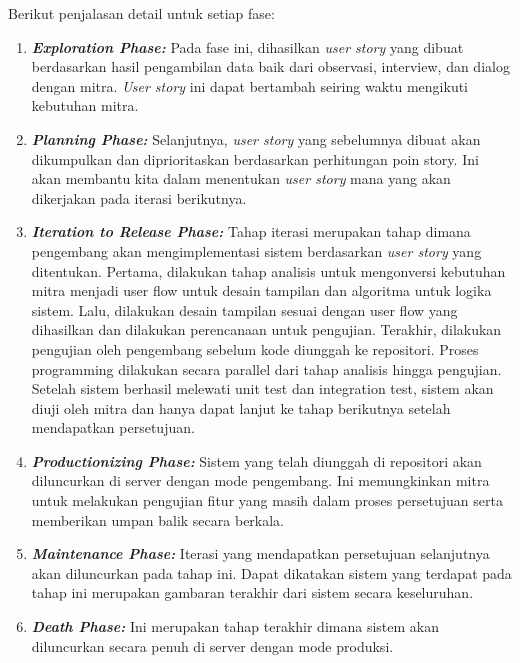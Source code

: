 Berikut penjalasan detail untuk setiap fase:
\begin{enumerate}
    \item \textbf{\textit{Exploration Phase:}}
    Pada fase ini, dihasilkan \textit{user story} yang dibuat berdasarkan hasil pengambilan data baik dari observasi, interview, dan dialog dengan mitra. \textit{User story} ini dapat bertambah seiring waktu mengikuti kebutuhan mitra.

    \item \textbf{\textit{Planning Phase:}}
    Selanjutnya, \textit{user story} yang sebelumnya dibuat akan dikumpulkan dan diprioritaskan berdasarkan perhitungan poin story. Ini akan membantu kita dalam menentukan \textit{user story} mana yang akan dikerjakan pada iterasi berikutnya.

    \item \textbf{\textit{Iteration to Release Phase:}}
    Tahap iterasi merupakan tahap dimana pengembang akan mengimplementasi sistem berdasarkan \textit{user story} yang ditentukan. Pertama, dilakukan tahap analisis untuk mengonversi kebutuhan mitra menjadi user flow untuk desain tampilan dan algoritma untuk logika sistem. Lalu, dilakukan desain tampilan sesuai dengan user flow yang dihasilkan dan dilakukan perencanaan untuk pengujian. Terakhir, dilakukan pengujian oleh pengembang sebelum kode diunggah ke repositori. Proses programming dilakukan secara parallel dari tahap analisis hingga pengujian. Setelah sistem berhasil melewati unit test dan integration test, sistem akan diuji oleh mitra dan hanya dapat lanjut ke tahap berikutnya setelah mendapatkan persetujuan.

    \item \textbf{\textit{Productionizing Phase:}}
    Sistem yang telah diunggah di repositori akan diluncurkan di server dengan mode pengembang. Ini memungkinkan mitra untuk melakukan pengujian fitur yang masih dalam proses persetujuan serta memberikan umpan balik secara berkala.

    \item \textbf{\textit{Maintenance Phase:}}
    Iterasi yang mendapatkan persetujuan selanjutnya akan diluncurkan pada tahap ini. Dapat dikatakan sistem yang terdapat pada tahap ini merupakan gambaran terakhir dari sistem secara keseluruhan.

    \item \textbf{\textit{Death Phase:}}
    Ini merupakan tahap terakhir dimana sistem akan diluncurkan secara penuh di server dengan mode produksi.
\end{enumerate}

